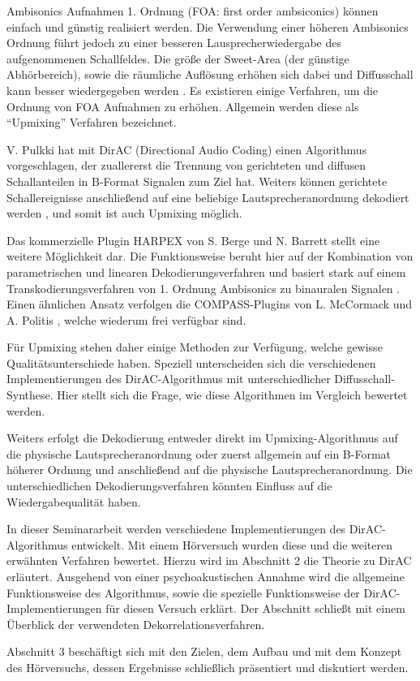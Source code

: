 Ambisonics Aufnahmen 1. Ordnung (FOA: first order ambsiconics) können einfach und günstig realisiert werden. 
Die Verwendung einer höheren Ambisonics Ordnung führt jedoch zu einer besseren Lausprecherwiedergabe des aufgenommenen Schallfeldes.
Die größe der Sweet-Area (der günstige Abhörbereich), sowie die räumliche Auflösung erhöhen sich dabei und Diffusschall kann besser wiedergegeben werden \cite{ambi-book}.
Es existieren einige Verfahren, um die Ordnung von FOA Aufnahmen zu erhöhen.
Allgemein werden diese als ``Upmixing'' Verfahren bezeichnet.

V. Pulkki hat mit DirAC (Directional Audio Coding) \cite{pulkki} einen Algorithmus vorgeschlagen, der zuallererst die Trennung von gerichteten und diffusen Schallanteilen in B-Format Signalen zum Ziel hat. Weiters können gerichtete Schallereignisse anschließend auf eine beliebige Lautsprecheranordnung dekodiert werden \cite{spatial-book}, und somit ist auch Upmixing möglich.

Das kommerzielle Plugin HARPEX von S. Berge und N. Barrett stellt eine weitere Möglichkeit dar. Die Funktionsweise beruht hier auf der Kombination von parametrischen und linearen Dekodierungsverfahren \cite{harpy2} und basiert stark auf einem Transkodierungsverfahren von 1. Ordnung Ambisonics zu binauralen Signalen \cite{harpy}. Einen ähnlichen Ansatz verfolgen die COMPASS-Plugins von L. McCormack und A. Politis \cite{compy}, welche wiederum frei verfügbar sind.

Für Upmixing stehen daher einige Methoden zur Verfügung, welche gewisse Qualitätsunterschiede haben.
Speziell unterscheiden sich die verschiedenen Implementierungen des DirAC-Algorithmus mit unterschiedlicher Diffusschall-Synthese.
Hier stellt sich die Frage, wie diese Algorithmen im Vergleich bewertet werden.

Weiters erfolgt die Dekodierung entweder direkt im Upmixing-Algorithmus auf die physische Lautsprecheranordnung oder zuerst allgemein auf ein B-Format höherer Ordnung und anschließend auf die physische Lautsprecheranordnung.
Die unterschiedlichen Dekodierungsverfahren könnten Einfluss auf die Wiedergabequalität haben.

In dieser Seminararbeit werden verschiedene Implementierungen des DirAC-Algorithmus entwickelt.
Mit einem Hörversuch wurden diese und die weiteren erwähnten Verfahren bewertet.
Hierzu wird im Abschnitt 2 die Theorie zu DirAC erläutert.
Ausgehend von einer psychoakustischen Annahme wird die allgemeine Funktionsweise des Algorithmus, sowie die spezielle Funktionsweise der DirAC-Implementierungen für diesen Versuch erklärt.
Der Abschnitt schließt mit einem Überblick der verwendeten Dekorrelationsverfahren.

Abschnitt 3 beschäftigt sich mit den Zielen, dem Aufbau und mit dem Konzept des Hörversuchs, dessen Ergebnisse schließlich präsentiert und diskutiert werden.
